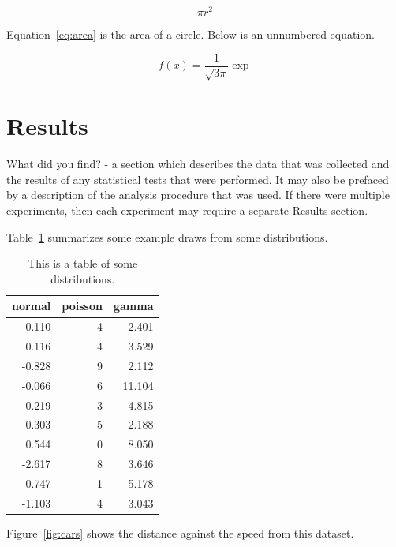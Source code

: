 \documentclass[12pt]{article}
\begin{document}
\begin{equation}
	\label{eq:area}
	\pi r^2
\end{equation}

Equation~\eqref{eq:area} is the area of a circle. Below is an unnumbered equation.

\[
f(x)=\frac{1}{\sqrt{3\pi}}\exp
\]

\section{Results}

What did you find? - a section which describes the data that was collected and the results of any statistical tests that were performed.  It may also be prefaced by a description of the analysis procedure that was used. If there were multiple experiments, then each experiment may require a separate Results section.

Table~\ref{tab:rv} summarizes some example draws from some distributions.

\lipsum[1-4]

\begin{table}[ht]
  \caption{This is a table of some distributions.}
  \label{tab:rv}
\centering
\begin{tabular}{rrr}
  \toprule
normal & poisson & gamma \\ 
  \midrule
-0.110 & 4 & 2.401 \\ 
  0.116 & 4 & 3.529 \\ 
  -0.828 & 9 & 2.112 \\ 
  -0.066 & 6 & 11.104 \\ 
  0.219 & 3 & 4.815 \\ 
  0.303 & 5 & 2.188 \\ 
  0.544 & 0 & 8.050 \\ 
  -2.617 & 8 & 3.646 \\ 
  0.747 & 1 & 5.178 \\ 
  -1.103 & 4 & 3.043 \\ 
   \bottomrule
\end{tabular}
\end{table}

Figure~\ref{fig:cars} shows the distance against the speed from this dataset.
\end{document}
